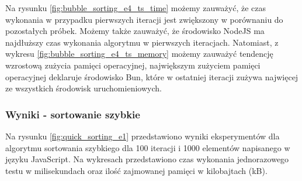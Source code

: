 Na rysunku \ref{fig:bubble_sorting_e4_ts_time} możemy zauważyć, że czas wykonania w przypadku pierwszych iteracji jest zwiększony w porównaniu do pozostałych próbek. Możemy także zauważyć, że środowisko NodeJS ma najdłuższy czas wykonania algorytmu w pierwszych iteracjach. Natomiast, z wykresu \ref{fig:bubble_sorting_e4_ts_memory} możemy zauważyć tendencję wzrostową zużycia pamięci operacyjnej, największym zużyciem pamięci operacyjnej deklaruje środowisko Bun, które w ostatniej iteracji zużywa najwięcej ze wszystkich środowisk uruchomieniowych.

\subsubsection{Wyniki - sortowanie szybkie}
Na rysunku \ref{fig:quick_sorting_e1} przedstawiono wyniki eksperymentów dla algorytmu sortowania szybkiego dla 100 iteracji i 1000 elementów napisanego w języku JavaScript. Na wykresach przedstawiono czas wykonania jednorazowego testu w milisekundach oraz ilość zajmowanej pamięci w kilobajtach (kB).

